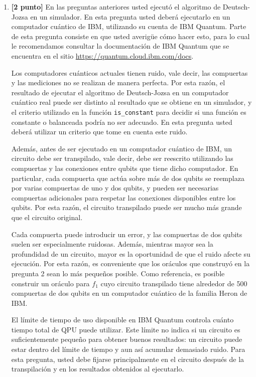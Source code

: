 \documentclass[10pt]{article}
\begin{document}
\begin{enumerate}
\item {\bf [2 punto]} En las preguntas anteriores usted ejecutó el algoritmo de Deutsch-Jozsa en un
  simulador. En esta pregunta usted deberá ejecutarlo en un computador cuántico de IBM, utilizando
  su cuenta de IBM Quantum. Parte de esta pregunta consiste en que usted averigüe cómo hacer esto,
  para lo cual le recomendamos consultar la documentación de IBM Quantum que se encuentra en el
  sitio \url{https://quantum.cloud.ibm.com/docs}.

  Los computadores cuánticos actuales tienen ruido, vale decir, las compuertas y las mediciones no
  se realizan de manera perfecta. Por esta razón, el resultado de ejecutar el algoritmo de
  Deutsch-Jozsa en un computador cuántico real puede ser distinto al resultado que se obtiene en un
  simulador, y el criterio utilizado en la función \texttt{is\_constant} para decidir si una función
  es constante o balanceada podría no ser adecuado. En esta pregunta usted deberá utilizar un
  criterio que tome en cuenta este ruido.

  Además, antes de ser ejecutado en un computador cuántico de IBM, un circuito debe ser
  transpilado, vale decir, debe ser reescrito utilizando las compuertas y las conexiones entre
  qubits que tiene dicho computador. En particular, cada compuerta que actúa sobre más de dos
  qubits se reemplaza por varias compuertas de uno y dos qubits, y pueden ser necesarias compuertas
  adicionales para respetar las conexiones disponibles entre los qubits. Por esta razón, el
  circuito transpilado puede ser mucho más grande que el circuito original.

  Cada compuerta puede introducir un error, y las compuertas de dos qubits suelen ser especialmente
  ruidosas. Además, mientras mayor sea la profundidad de un circuito, mayor es la oportunidad de que
  el ruido afecte su ejecución. Por esta razón, es conveniente que los oráculos que construyó en la
  pregunta 2 sean lo más pequeños posible. Como referencia, es posible construir un oráculo para
  $f_1$ cuyo circuito transpilado tiene alrededor de 500 compuertas de dos qubits en un computador
  cuántico de la familia Heron de IBM.

  El límite de tiempo de uso disponible en IBM Quantum controla cuánto tiempo total de QPU puede
  utilizar. Este límite no indica si un circuito es suficientemente pequeño para obtener buenos
  resultados: un circuito puede estar dentro del límite de tiempo y aun así acumular demasiado
  ruido. Para esta pregunta, usted debe fijarse principalmente en el circuito después de la
  transpilación y en los resultados obtenidos al ejecutarlo.


\end{enumerate}
\end{document}

